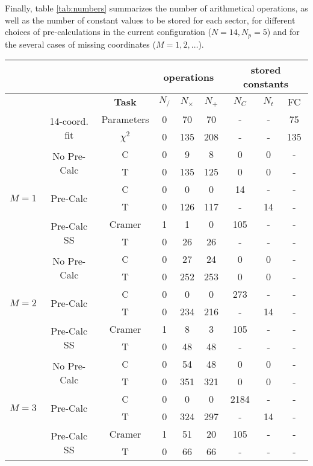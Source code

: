 \documentclass[a4paper,11pt]{article}
\begin{document}
Finally, table \ref{tab:numbers} summarizes the number of arithmetical
operations, 
as well as the number of constant values to be stored for each sector,
for different choices of pre-calculations in the current configuration
($N = 14, N_p = 5$) and for the several cases of missing coordinates ($M=1,2,\ldots$).

\begin{table}[htb]
  \centering
  \begin{tabular}{|c|c|c|c|c|c|c|c|c|}
    \cline{4-9}
    \multicolumn{3}{c|}{ }&\multicolumn{3}{|c|}{operations}&\multicolumn{3}{|c|}{stored constants}\\
    \hline
    &&\textbf{Task} & $N_/$ & $N_\times$ & $N_+$ & $N_C$ & $N_t$ & FC \\
    \hline\hline
    &\multirow{2}{*}{14-coord. fit}&Parameters & 0 & 70  & 70 &- &- & 75\\
    &&$\chi^2$ & 0 & 135 & 208 & -& -& 135 \\
    \hline \hline

    \multirow{6}{*}{$M=1$} & \multirow{2}{*}{No Pre-Calc}& C & 0 & 9 & 8& 0& 0& - \\
    && T & 0 & 135 & 125 & 0 & 0 & - \\
    \cline{2-9}
    &\multirow{2}{*}{Pre-Calc}& C & 0 & 0 & 0 & 14 & - & - \\
    && T & 0 & 126 & 117 & - & 14 &-\\
    \cline{2-9}
    &\multirow{2}{*}{Pre-Calc SS}& Cramer & 1 & 1 & 0 & 105 & - & - \\
    && T & 0 & 26 & 26 & - & - &-\\
    \hline \hline

    \multirow{6}{*}{$M=2$} & \multirow{2}{*}{No Pre-Calc}& C & 0 & 27 & 24& 0& 0& - \\
    && T & 0 & 252 & 253 & 0 & 0 & - \\
    \cline{2-9}
    &\multirow{2}{*}{Pre-Calc}& C & 0 & 0 & 0 & 273 & - & - \\
    && T & 0 & 234 & 216 & - & 14 &-\\
    \cline{2-9}
    &\multirow{2}{*}{Pre-Calc SS}& Cramer & 1 & 8 & 3 & 105 & - & - \\
    && T & 0 & 48 & 48 & - & - &-\\
    \hline \hline

    \multirow{6}{*}{$M=3$} & \multirow{2}{*}{No Pre-Calc}& C & 0 & 54 & 48& 0& 0& - \\
    && T & 0 & 351 & 321 & 0 & 0 & - \\
    \cline{2-9}
    &\multirow{2}{*}{Pre-Calc}& C & 0 & 0 & 0 & 2184 & - & - \\
    && T & 0 & 324 & 297 & - & 14 &-\\
    \cline{2-9}
    &\multirow{2}{*}{Pre-Calc SS}& Cramer & 1 & 51 & 20 & 105 & - & - \\
    && T & 0 & 66 & 66 & - & - &-\\
    \hline \hline


\end{tabular}
\end{table}
\end{document}
